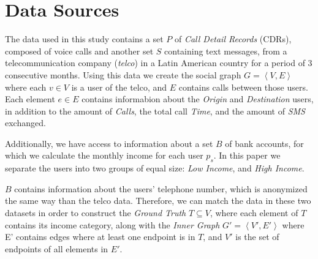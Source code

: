 \section{Data Sources}
\label{sec:data_sources}

The data used in this study contains a set $P$ of \textit{Call Detail Records} (CDRs), composed of voice calls and another set $S$ containing text messages, from a telecommunication company (\textit{telco}) in a Latin American country for a period of 3 consecutive months. Using this data we create the social graph $G = \left< V, E \right>$ where each $v \in V$ is a user of the telco, and $E$ contains calls between those users. Each element $e \in E$ contains informabion about the \emph{Origin} and \emph{Destination} users, in addition to the amount of \emph{Calls}, the total call \emph{Time}, and the amount of \emph{SMS} exchanged.

Additionally, we have access to information about a set $B$ of bank accounts, for which we calculate the monthly income for each user $p_s$. In this paper we separate the users into two groups of equal size: \emph{Low Income}, and \emph{High Income}.

$B$ contains information about the users' telephone number, which is anonymized the same way than the telco data.  Therefore, we can match the data in these two datasets in order to construct the \emph{Ground Truth} $T \subseteq V$, where each element of $T$ contains its income category, along with the \emph{Inner Graph} $G' = \left< V', E' \right>$ where E' contains edges where at least one endpoint is in $T$, and $V'$ is the set of endpoints of all elements in $E'$.
